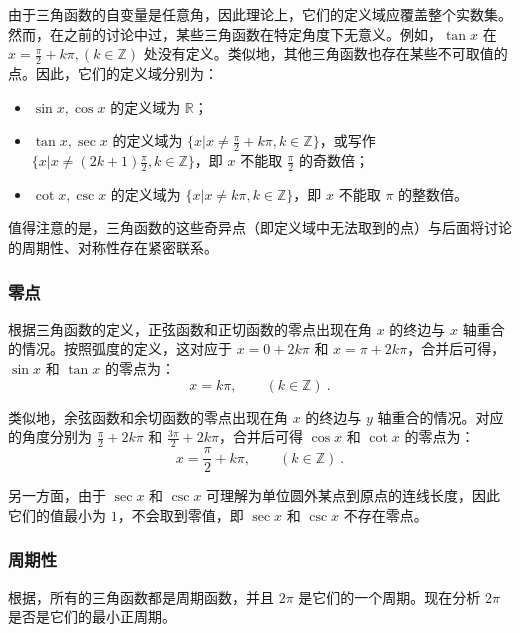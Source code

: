 由于三角函数的自变量是任意角，因此理论上，它们的定义域应覆盖整个实数集。然而，在之前的讨论中过，某些三角函数在特定角度下无意义。例如，$\tan x$ 在 $\displaystyle x=\frac{\pi}{2}+k\pi, (k\in\mathbb{Z})$ 处没有定义。类似地，其他三角函数也存在某些不可取值的点。因此，它们的定义域分别为：
\begin{itemize}
\item $\sin x,\cos x$ 的定义域为 $\mathbb{R}$；
\item $\tan x,\sec x$ 的定义域为 $\displaystyle\{x|x\neq\frac{\pi}{2}+k\pi,k\in\mathbb{Z}\}$，或写作$\displaystyle\{x|x\neq(2k+1)\frac{\pi}{2},k\in\mathbb{Z}\}$，即 $x$ 不能取 $\frac{\pi}{2}$ 的奇数倍；
\item $\cot x,\csc x$ 的定义域为 $\displaystyle\{x|x\neq k\pi,k\in\mathbb{Z}\}$，即 $x$ 不能取 $\pi$ 的整数倍。
\end{itemize}

值得注意的是，三角函数的这些奇异点（即定义域中无法取到的点）与后面将讨论的周期性、对称性存在紧密联系。

\subsubsection{零点}

根据三角函数的定义，正弦函数和正切函数的零点出现在角 $x$ 的终边与 $x$ 轴重合的情况。按照弧度的定义，这对应于 $x = 0+2k\pi$ 和 $x = \pi+2k\pi$，合并后可得， $\sin x$ 和 $\tan x$ 的零点为：
\begin{equation}
x = k\pi, \qquad (k\in\mathbb{Z})~.
\end{equation}

类似地，余弦函数和余切函数的零点出现在角 $x$ 的终边与 $y$ 轴重合的情况。对应的角度分别为 $\displaystyle{\frac{\pi}{2}} + 2k\pi$ 和 $\displaystyle{\frac{3\pi}{2}} + 2k\pi$，合并后可得 $\cos x$ 和 $\cot x$ 的零点为：
\begin{equation}
x = \frac{\pi}{2} + k\pi, \qquad (k\in\mathbb{Z})~.
\end{equation}

另一方面，由于 $\sec x$ 和 $\csc x$ 可理解为单位圆外某点到原点的连线长度，因此它们的值最小为 $1$，不会取到零值，即 $\sec x$ 和 $\csc x$ 不存在零点。

\subsubsection{周期性}

根据，所有的三角函数都是周期函数，并且 $2\pi$ 是它们的一个周期。现在分析 $2\pi$ 是否是它们的最小正周期。

